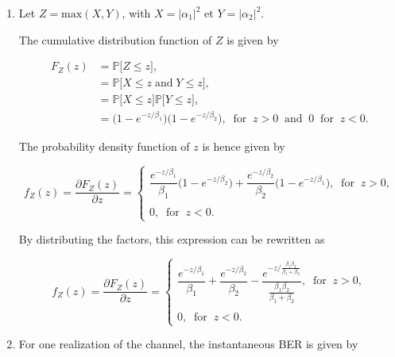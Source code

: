 \documentclass [a4paper, 11pt] {article}
\begin{document}
\begin{solution}
\begin{enumerate}
\item Let $Z = \text{max}(X,Y)$, with $X = |\alpha_1|^2$ et $Y = |\alpha_2|^2$.

The cumulative distribution function of $Z$ is given by

\begin{align}
    F_Z(z) &= \mathbb{P}\big[ Z \leq z\big], \\
    &= \mathbb{P}\big[ X \leq z \; \text{and} \; Y \leq z\big], \\
    &= \mathbb{P}\big[ X \leq z\big]\mathbb{P}\big[ Y \leq z\big], \\
    &= \Big(1-e^{-z/\beta_1} \Big)\Big(1-e^{-z/\beta_2} \Big), \; \; \text{for} \; \; z > 0 \; \; \text{and} \; \; 0 \; \; \text{for} \; \; z < 0.
\end{align}

The probability density function of $z$ is hence given by

\begin{equation}
    f_Z(z) = \dfrac{\partial F_Z(z)}{\partial z}=\left\{
                \begin{array}{ll}
                 \dfrac{e^{-z/\beta_1}}{\beta_1}\Big(1-e^{-z/\beta_2} \Big) + \dfrac{e^{-z/\beta_2}}{\beta_2}\Big(1-e^{-z/\beta_1} \Big), \; \; \text{for} \; \; z > 0, \\
                  \\
                0, \; \; \text{for} \; \; z < 0.
                \end{array}
              \right.
\end{equation}

By distributing the factors, this expression can be rewritten as 

\begin{equation}
    f_Z(z) = \dfrac{\partial F_Z(z)}{\partial z}=\left\{
                \begin{array}{ll}
                 \dfrac{e^{-z/\beta_1}}{\beta_1} + \dfrac{e^{-z/\beta_2}}{\beta_2} - \dfrac{e^{-z/\frac{\beta_1 \beta_2}{\beta_1+\beta_2}}}{\frac{\beta_1 \beta_2}{\beta_1+\beta_2}}, \; \; \text{for} \; \; z > 0, \\
                  \\
                0, \; \; \text{for} \; \; z < 0.
                \end{array}
              \right.
\end{equation}

\item For one realization of the channel, the instantaneous BER is given by 


\end{enumerate}
\end{solution}
\end{document}
